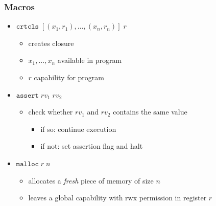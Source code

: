 \documentclass{beamer}
\newcommand{\var}[1]{\mathit{#1}}
\newcommand{\rv}{\var{rv}}
\newcommand{\plainperm}[1]{\mathrm{#1}}
\newcommand{\rwx}{\plainperm{rwx}}
\newcommand{\glob}{\plainperm{global}}
\begin{document}
\begin{frame}
  \frametitle{Macros}
  \begin{itemize}[<+->]
  \item $\mathtt{crtcls} \;[(x_1,r_1),\dots, (x_n,r_n)] \; r$ 
    \begin{itemize}
    \item creates closure
    \item $x_1, \dots, x_n$ available in program
    \item $r$ capability for program
    \end{itemize}
  \item $\mathtt{assert} \; \rv_1 \; \rv_2$
    \begin{itemize}
    \item check whether $\rv_1$ and $\rv_2$ contains the same value
      \begin{itemize}
      \item if so: continue execution
      \item if not: set assertion flag and halt
      \end{itemize}
    \end{itemize}
  \item $\mathtt{malloc} \; r \; n$ 
    \begin{itemize}
    \item allocates a \emph{fresh} piece of memory of size $n$
    \item leaves a $\glob$ capability with $\rwx$ permission in register $r$
    \end{itemize}
  \end{itemize}
\end{frame}
\end{document}
